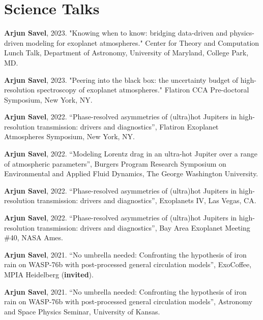 \documentclass[letterpaper,10.5pt]{article}
\newcommand{\resumeSubHeadingListStart}{\begin{itemize}[leftmargin=*]}
\newcommand{\shorterSection}[1]{\vspace{-10pt}\section{#1}}
\begin{document}
\shorterSection{Science Talks}
\small
  \begin{list}{}{\cvlist}

  \item[{\color{numcolor}\scriptsize12}] \textbf{Arjun Savel}, 2023. "Knowing when to know: bridging data-driven and physics-driven modeling for exoplanet atmospheres." Center for Theory and Computation Lunch Talk, Department of Astronomy, University of Maryland, College Park, MD.

  \item[{\color{numcolor}\scriptsize11}] \textbf{Arjun Savel}, 2023. "Peering into the black box: 
the uncertainty budget of high-resolution spectroscopy of exoplanet atmospheres." Flatiron CCA Pre-doctoral Symposium, New York, NY.

\item[{\color{numcolor}\scriptsize10}] \textbf{Arjun Savel}, 2022. ``Phase-resolved asymmetries of (ultra)hot Jupiters in high-resolution transmission: drivers and diagnostics'', Flatiron Exoplanet Atmospheres Symposium, New York, NY.

  \item[{\color{numcolor}\scriptsize9}] \textbf{Arjun Savel}, 2022. ``Modeling Lorentz drag in an ultra-hot Jupiter over a range of atmospheric parameters'', Burgers Program Research Symposium on Environmental and Applied Fluid Dynamics, The George Washington University.

     \item[{\color{numcolor}\scriptsize8}] \textbf{Arjun Savel}, 2022. ``Phase-resolved asymmetries of (ultra)hot Jupiters in high-resolution transmission: drivers and diagnostics'', Exoplanets IV, Las Vegas, CA.


   \item[{\color{numcolor}\scriptsize7}] \textbf{Arjun Savel}, 2022. ``Phase-resolved asymmetries of (ultra)hot Jupiters in high-resolution transmission: drivers and diagnostics'', Bay Area Exoplanet Meeting \#40, NASA Ames.

 \item[{\color{numcolor}\scriptsize6}] \textbf{Arjun Savel}, 2021. ``No umbrella needed: Confronting the hypothesis of iron rain on WASP-76b with post-processed general circulation models'', ExoCoffee, MPIA Heidelberg (\textbf{invited}).

\item[{\color{numcolor}\scriptsize5}] \textbf{Arjun Savel}, 2021. ``No umbrella needed: Confronting the hypothesis of iron rain on WASP-76b with post-processed general circulation models'', Astronomy and Space Physics Seminar, University of Kansas.



\end{list}
\end{document}
